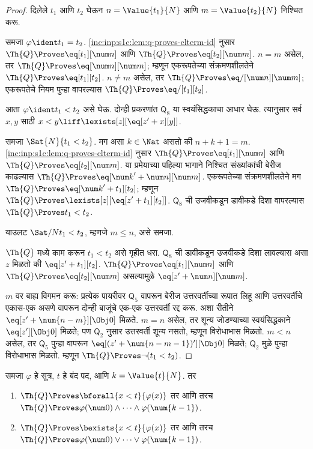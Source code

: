 \begin{proof}
दिलेले $t_1$ आणि $t_2$ घेऊन
$n = \Value{t_1}{N}$ आणि $m = \Value{t_2}{N}$
निश्चित करू.

समजा $\varphi \ident t_1 = t_2$.
\ref{inc:inp:s1c:lem:q-proves-clterm-id} नुसार
$\Th{Q} \Proves \eq[t_1][\num n]$ आणि
$\Th{Q} \Proves \eq[t_2][\num m]$.
$n = m$ असेल, तर
$\Th{Q} \Proves \eq[\num n][\num m]$;
म्हणून एकरूपतेच्या संक्रमणशीलतेने
$\Th{Q} \Proves \eq[t_1][t_2]$.
$n \neq m$ असेल, तर
$\Th{Q} \Proves \eq/[\num n][\num m]$;
एकरूपतेचे नियम पुन्हा वापरल्यास
$\Th{Q} \Proves \eq/[t_1][t_2]$.

आता $\varphi \ident t_1 < t_2$ असे घेऊ. दोन्ही प्रकरणांत
$\mathsf{Q}_8$ या स्वयंसिद्धकाचा आधार घेऊ. त्यानुसार सर्व
$x,y$ साठी
$x < y \liff \lexists[z][\eq[z' + x][y]]$.

समजा $\Sat{N}{t_1 < t_2}$. मग असा $k \in \Nat$
असतो की $n + k + 1 = m$.
\ref{inc:inp:s1c:lem:q-proves-clterm-id} नुसार
$\Th{Q} \Proves \eq[t_1][\num n]$ आणि
$\Th{Q} \Proves \eq[t_2][\num m]$.
या प्रमेयाच्या पहिल्या भागाने निश्चित संख्यांकांची बेरीज
काढल्यास
$\Th{Q} \Proves \eq[{\num k}' + \num n][\num m]$.
एकरूपतेच्या संक्रमणशीलतेने मग
$\Th{Q} \Proves \eq[{\num k}' + t_1][t_2]$;
म्हणून
$\Th{Q} \Proves \lexists[z][\eq[z' + t_1][t_2]]$.
$\mathsf{Q}_8$ ची उजवीकडून डावीकडे दिशा वापरल्यास
$\Th{Q} \Proves t_1 < t_2$.

याउलट $\Sat/{N}{t_1 < t_2}$, म्हणजे $m \leq n$,
असे समजा.

$\Th{Q}$ मध्ये काम करून $t_1 < t_2$ असे गृहीत धरा.
$\mathsf{Q}_8$ ची डावीकडून उजवीकडे दिशा लावल्यास असा $z$
मिळतो की $\eq[z' + t_1][t_2]$.
$\Th{Q} \Proves \eq[t_1][\num n]$ आणि
$\Th{Q} \Proves \eq[t_2][\num m]$ असल्यामुळे
$\eq[z' + \num n][\num m]$.

$m$ वर बाह्य विगमन करू: प्रत्येक पायरीवर $\mathsf{Q}_5$
वापरून बेरीज उत्तरवर्तीच्या रूपात लिहू आणि उत्तरवर्तीचे
एकास-एक असणे वापरून दोन्ही बाजूंचे एक-एक उत्तरवर्ती
रद्द करू. अशा रीतीने
$\eq[z' + \num{n - m}][\Obj 0]$ मिळते.
$m = n$ असेल, तर शून्य जोडण्याच्या स्वयंसिद्धकाने
$\eq[z'][\Obj 0]$ मिळते; पण $\mathsf{Q}_2$ नुसार उत्तरवर्ती
शून्य नसतो, म्हणून विरोधाभास मिळतो.
$m < n$ असेल, तर $\mathsf{Q}_5$ पुन्हा वापरून
$\eq[(z' + \num{n - m - 1})'][\Obj 0]$ मिळते;
$\mathsf{Q}_2$ मुळे पुन्हा विरोधाभास मिळतो.
म्हणून $\Th{Q} \Proves \lnot(t_1 < t_2)$.
\end{proof}

\begin{lem}
\label{inc:inp:s1c:lem:bounded-quant-equiv}
समजा $\varphi$ हे सूत्र, $t$ हे बंद पद, आणि
$k=\Value{t}{N}$. तर
\begin{enumerate}
\item $\Th{Q} \Proves \bforall{x<t}{\varphi(x)}$ तर आणि तरच $\Th{Q} \Proves
    \varphi(\num 0) \land \dots \land \varphi(\num{k-1})$.
\item $\Th{Q} \Proves \bexists{x<t}{\varphi(x)}$ तर आणि तरच $\Th{Q} \Proves
    \varphi(\num 0) \lor \dots \lor \varphi(\num{k-1})$.
\end{enumerate}
\end{lem}


